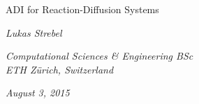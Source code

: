 \begin{titlepage}

\begin{center}
{ \huge ADI for Reaction-Diffusion Systems}


{ \emph {Lukas Strebel}} 

{ \emph {Computational Sciences \& Engineering BSc }\\ \emph{ETH Z\"urich, Switzerland} }

{ \emph{August 3, 2015}}

\end{center}
\end{titlepage}

